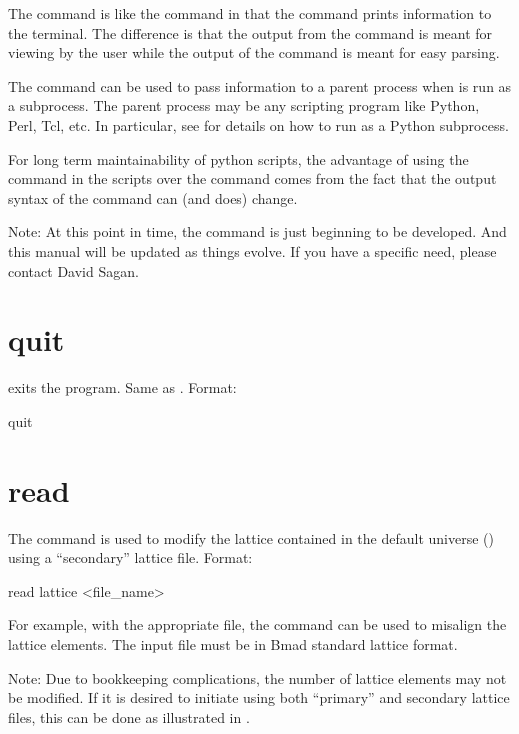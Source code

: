 The  command is like the  command in that the
 command prints information to the terminal.  The
difference is that the output from the  command is meant for
viewing by the user while the output of the  command is
meant for easy parsing.

The  command can be used to pass information to a parent
process when \tao is run as a subprocess.
The parent process may be any scripting program like Python, Perl,
Tcl, etc.  In particular, see  for details on how to
run \tao as a Python subprocess.

For long term maintainability of python scripts, the advantage of
using the  command in the scripts over the 
command comes from the fact that the output syntax of the 
 command can (and does) change. 

Note: At this point in time, the  command is just beginning
to be developed. And this manual will be updated as things evolve. If
you have a specific need, please contact David Sagan.

\section{quit}
\label{s:quit}

 exits the program. Same as .
Format:
\begin{example}
  quit
\end{example}

\section{read}
\label{s:read}

The  command is used to modify the  lattice
contained in the default universe () using a ``secondary''
lattice file. Format:
\begin{example}
  read lattice <file_name>
\end{example}

\vskip 0.2in 
For example, with the appropriate file, the  command can be
used to misalign the lattice elements. The input file must be in Bmad
standard lattice format.

Note: Due to bookkeeping complications, the number of lattice elements
may not be modified. If it is desired to initiate \tao using both
``primary'' and secondary lattice files, this can be done as
illustrated in .

